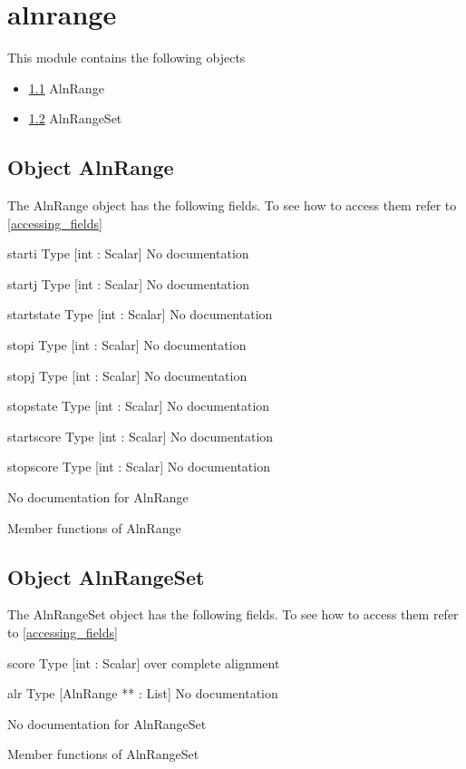 \section{alnrange}
\label{module_alnrange}
This module contains the following objects

\begin{itemize}
\item \ref{object_AlnRange} AlnRange

\item \ref{object_AlnRangeSet} AlnRangeSet

\end{itemize}
\subsection{Object AlnRange}

\label{object_AlnRange}

The AlnRange object has the following fields. To see how to access them refer to \ref{accessing_fields}
\begin{description}
\item{starti} Type [int : Scalar] No documentation

\item{startj} Type [int : Scalar] No documentation

\item{startstate} Type [int : Scalar] No documentation

\item{stopi} Type [int : Scalar] No documentation

\item{stopj} Type [int : Scalar] No documentation

\item{stopstate} Type [int : Scalar] No documentation

\item{startscore} Type [int : Scalar] No documentation

\item{stopscore} Type [int : Scalar] No documentation

\end{description}
No documentation for AlnRange

Member functions of AlnRange

\subsection{Object AlnRangeSet}

\label{object_AlnRangeSet}

The AlnRangeSet object has the following fields. To see how to access them refer to \ref{accessing_fields}
\begin{description}
\item{score} Type [int : Scalar]  over complete alignment

\item{alr} Type [AlnRange ** : List] No documentation

\end{description}
No documentation for AlnRangeSet

Member functions of AlnRangeSet

